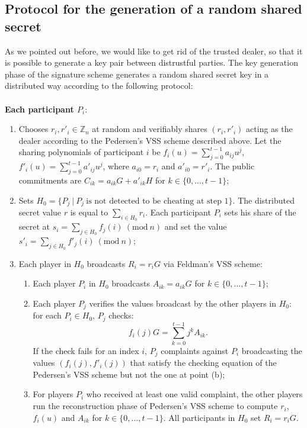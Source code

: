 \bigskip

\subsection{Protocol for the generation of a random shared secret}
\label{subsec:2}
As we pointed out before, we would like to get rid of the trusted dealer, so that it is possible to generate a key pair between distrustful parties. The key generation phase of the signature scheme generates a random shared secret key in a distributed way according to the following protocol:
\\
\\
{\bf Each participant $P_i$}:
\begin{enumerate}
	\item Chooses $r_i, r'_i \in \mathbb{Z}_n$ at random and verifiably shares $(r_i, r'_i)$ acting as the dealer according to the Pedersen's VSS scheme described above. Let the sharing polynomials of participant $i$ be $f_i(u) = \sum_{j = 0}^{t - 1}a_{ij}u^j$, $f'_i(u) = \sum_{j= 0}^{t - 1}a'_{ij}u^j$, where $a_{i0} = r_i$ and $a'_{i0} = r'_i$. The public commitments are $C_{ik} = a_{ik}G + a'_{ik}H$ for $k \in \{0, ..., t - 1\}$;
	\item Sets $H_0 = \{P_j \ | \ P_j \ \text{is not detected to be cheating at step 1}\}$. The distributed secret value $r$ is equal to $\sum_{i \in H_0}r_i$. Each participant $P_i$ sets his share of the secret at $s_i= \sum_{j \in H_0}f_j(i) \ (\text{mod} \ n)$ and set the value $s'_i = \sum_{j \in H_0}f'_j(i) \ (\text{mod} \ n)$;
	\item Each player in $H_0$ broadcasts $R_i = r_iG$ via Feldman's VSS scheme:
	\begin{enumerate}
		\item Each player $P_i$ in $H_0$ broadcasts $A_{ik} = a_{ik}G$ for $k \in \{0, ..., t - 1\}$;
		\item Each player $P_j$ verifies the values broadcast by the other players in $H_0$: for each $P_i \in H_0$, $P_j$ checks:
		$$f_i(j)G = \sum_{k = 0}^{t - 1} j^kA_{ik}.$$
		If the check fails for an index $i$, $P_j$ complaints against $P_i$ broadcasting the values $(f_i(j), f'_i(j))$ that satisfy the checking equation of the Pedersen's VSS scheme  but not the one at point (b);
		\item For players $P_i$ who received at least one valid complaint, the other players run the reconstruction phase of Pedersen's VSS scheme to compute $r_i$, $f_i(u)$ and $A_{ik}$ for $k \in \{0, ..., t - 1\}$. All participants in $H_0$ set $R_i = r_iG$. 
	\end{enumerate} 
\end{enumerate}
